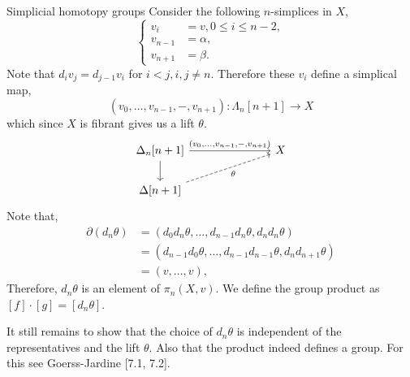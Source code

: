 \documentclass[10pt]{beamer}
\begin{document}
\begin{frame}{Simplicial homotopy groups}
		Consider the following \( n \)-simplices in \( X \),
		\[ \begin{cases}
			v_i &= v, 0 \leq i \leq n-2,\\
			v_{n-1} &= \alpha,\\
			v_{n+1} &= \beta.
		\end{cases} \]
		Note that \( d_i v_j=d_{j-1}v_i \) for \( i<j, i,j \neq n. \) Therefore these \( v_i \) define a simplical map, \[ (v_0,\dots,v_{n-1},-,v_{n+1}): \Lambda_n[n+1] \to X \] which since \( X \) is fibrant gives us a lift \( \theta \).
		\[\begin{tikzcd}
			{\Delta_n[n+1]} &&& X \\
			{\Delta[n+1]}
			\arrow["{ (v_0,\dots,v_{n-1},-,v_{n+1})}", from=1-1, to=1-4]
			\arrow[from=1-1, to=2-1]
			\arrow["\theta"', dashed, from=2-1, to=1-4]
		\end{tikzcd}\]
		Note that,
		\begin{align*}
			\partial(d_n\theta) &= (d_0d_n\theta, \dots, d_{n-1}d_n\theta, d_nd_n\theta) \\
			&= (d_{n-1}d_0\theta, \dots, d_{n-1}d_{n-1}\theta, d_nd_{n+1}\theta) \\
			&= (v, \dots, v),
		\end{align*}
		Therefore, \( d_n\theta \) is an element of \( \pi_n(X,v) \).
		We define the group product as \( [f]\cdot [g]=[d_n\theta] \).
		
		It still remains to show that the choice of \( d_n\theta \) is independent of the representatives and the lift \( \theta \). Also that the product indeed defines a group. For this see Goerss-Jardine [7.1, 7.2].
\end{frame}
\end{document}

